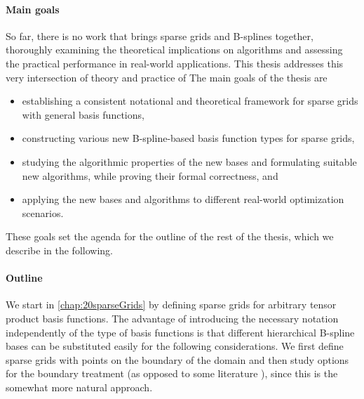 \paragraph{Main goals}

So far, there is no work that brings sparse grids and B-splines together,
thoroughly examining the theoretical implications on algorithms and
assessing the practical performance in real-world applications.
This thesis addresses this very intersection of theory and practice of
The main goals of the thesis are
\begin{itemize}
  \item
  establishing a consistent notational and theoretical
  framework for sparse grids with general basis functions,
  
  \item
  constructing various new B-spline-based basis function types for
  sparse grids,
  
  \item
  studying the algorithmic properties of the new bases and
  formulating suitable new algorithms,
  while proving their formal correctness, and
  
  \item
  applying the new bases and algorithms to different real-world
  optimization scenarios.
\end{itemize}
These goals set the agenda for the outline of the rest of the thesis,
which we describe in the following.

\paragraph{Outline}

We start in \cref{chap:20sparseGrids} by defining sparse grids
for arbitrary tensor product basis functions.
The advantage of introducing the necessary notation independently
of the type of basis functions is that
different hierarchical B-spline bases can be substituted easily
for the following considerations.
We first define sparse grids with points on the boundary of the domain
and then study options for the boundary treatment
(as opposed to some literature %
),
since this is the somewhat more natural approach.

